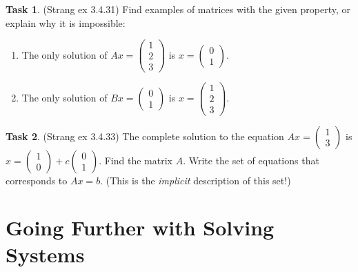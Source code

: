 \documentclass[10pt,]{book}
\theoremstyle{plain}
\theoremstyle{definition}
\numberwithin{equation}{section}
\newtheorem{task}{Task}[chapter]
\begin{document}
\begin{task}
\label{task-106}
(Strang ex 3.4.31)
        Find examples of matrices with the given property, or explain why it is
        impossible:
        \begin{enumerate}
\item{}
            The only solution of \(Ax = \left(\begin{smallmatrix}
            1 \\ 2 \\ 3 \end{smallmatrix}\right)\) is \(x = \left(\begin{smallmatrix}
            0 \\ 1 \end{smallmatrix}\right)\).
          \item{}
            The only solution of \(Bx = \left(\begin{smallmatrix}
            0 \\ 1 \end{smallmatrix}\right)\) is
            \(x = \left(\begin{smallmatrix}
            1 \\ 2 \\ 3 \end{smallmatrix}\right)\).
          \end{enumerate}
\end{task}
\begin{task}
\label{task-107}
(Strang ex 3.4.33)
        The complete solution to the equation \(Ax = \left(\begin{smallmatrix}
        1 \\ 3\end{smallmatrix}\right)\) is \(x = \left(\begin{smallmatrix}
        1 \\ 0\end{smallmatrix}\right) +
        c\left(\begin{smallmatrix}0\\ 1 \end{smallmatrix}\right)\).
        Find the matrix \(A\). Write the set of equations that corresponds to
        \(Ax = b\). (This is the \emph{implicit} description of this set!)
      \end{task}
\clearpage
\typeout{************************************************}
\typeout{************************************************}
\section[Going Further with Solving Systems]{Going Further with Solving Systems}\label{soln-gf}
\typeout{************************************************}
\typeout{************************************************}
\end{document}
